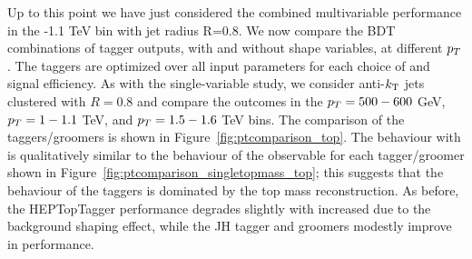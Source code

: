 

Up to this point we have just considered the combined multivariable performance in the -1.1 TeV bin with jet radius R=0.8. We now compare the BDT combinations of tagger outputs, with and without shape variables, at different $p_T$. The taggers are optimized over all input parameters for each choice of \pt and signal efficiency. As with the single-variable study, we consider anti-$k_{\rm T}$ jets clustered with $R=0.8$ and compare the outcomes in the $p_T=500-600$ GeV, $p_T=1-1.1$ TeV, and $p_T=1.5-1.6$ TeV bins. The comparison of the taggers/groomers is shown in Figure~\ref{fig:ptcomparison_top}. The behaviour with \pt is qualitatively similar to the behaviour of the \topmass observable for each tagger/groomer shown in Figure~\ref{fig:ptcomparison_singletopmass_top}; this suggests that the \pt behaviour of the taggers is dominated by the top mass reconstruction. As before, the HEPTopTagger performance degrades slightly with increased \pt due to the background shaping effect, while the JH tagger and groomers modestly improve in performance.

